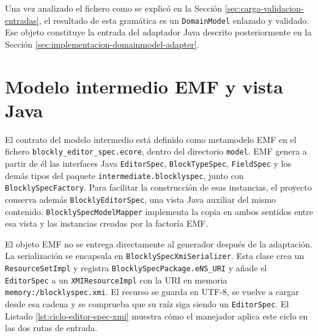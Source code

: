 Una vez analizado el fichero como se explicó en la Sección
\ref{sec:carga-validacion-entradas}, el resultado de esta gramática es un
\texttt{DomainModel} enlazado y validado. Ese objeto constituye la entrada del
adaptador Java descrito posteriormente en la Sección
\ref{sec:implementacion-domainmodel-adapter}.

\section{Modelo intermedio EMF y vista Java}
\label{sec:implementacion-modelo-intermedio}

El contrato del modelo intermedio está definido como metamodelo EMF en el
fichero \texttt{blockly\_editor\_spec.ecore}, dentro del directorio
\texttt{model}. EMF genera a partir de él las interfaces Java
\texttt{EditorSpec}, \texttt{BlockTypeSpec}, \texttt{FieldSpec} y los demás
tipos del paquete \texttt{intermediate.blocklyspec}, junto con
\texttt{BlocklySpecFactory}. Para facilitar la construcción de esas instancias,
el proyecto conserva además \texttt{BlocklyEditorSpec}, una vista Java auxiliar del
mismo contenido. \texttt{BlocklySpecModelMapper} implementa la copia en ambos
sentidos entre esa vista y las instancias creadas por la factoría EMF.

El objeto EMF no se entrega directamente al generador después de la adaptación.
La serialización se encapsula en
\texttt{BlocklySpecXmi}\allowbreak\texttt{Serializer}. Esta clase crea un
\texttt{ResourceSet}\allowbreak\texttt{Impl} y registra
\texttt{BlocklySpecPackage.}\allowbreak\texttt{eNS\_URI} y añade el
\texttt{EditorSpec} a un \texttt{XMIResource}\allowbreak\texttt{Impl} con la
URI en memoria \texttt{memory:/}\allowbreak\texttt{blocklyspec.xmi}. El recurso se guarda en UTF-8, se vuelve a
cargar desde esa cadena y se comprueba que su raíz siga siendo un
\texttt{EditorSpec}. El Listado \ref{lst:ciclo-editor-spec-xmi} muestra cómo el
manejador aplica este ciclo en las dos rutas de entrada.

